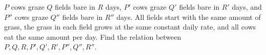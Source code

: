 $P$ cows graze $Q$ fields bare in $R$ days, $P'$ cows graze $Q'$ fields bare in $R'$ days, and $P''$ cows graze $Q''$ fields bare in $R''$ days. All fields start with the same amount of grass, the grass in each field grows at the same constant daily rate, and all cows eat the same amount per day. Find the relation between $P,Q,R,P',Q',R',P'',Q'',R''$.
